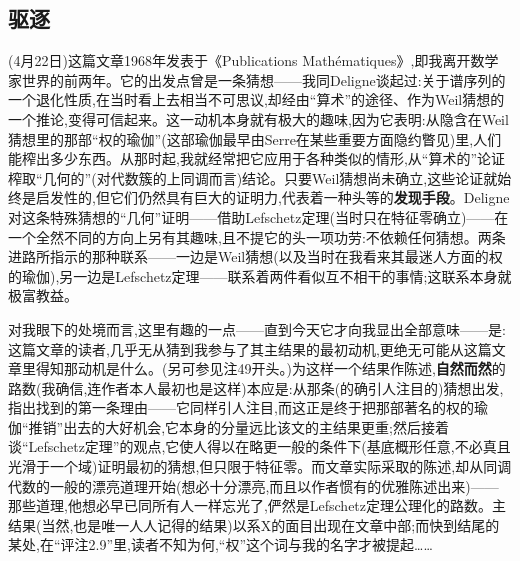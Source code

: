 \subsection{驱逐}


\pmark{} (4月22日)这篇文章1968年发表于《Publications Mathématiques》,即我离开数学家世界的前两年。它的出发点曾是一条猜想——我同Deligne谈起过:关于谱序列的一个退化性质,在当时看上去相当不可思议,却经由“算术”的途径、作为Weil猜想的一个推论,变得可信起来。这一动机本身就有极大的趣味,因为它表明:从隐含在Weil猜想里的那部“权的瑜伽”(这部瑜伽最早由Serre在某些重要方面隐约瞥见)里,人们能榨出多少东西。从那时起,我就经常把它应用于各种类似的情形,从“算术的”论证榨取“几何的”(对代数簇的上同调而言)结论。只要Weil猜想尚未确立,这些论证就始终是启发性的,但它们仍然具有巨大的证明力,代表着一种头等的\textbf{发现手段}。Deligne对这条特殊猜想的“几何”证明——借助Lefschetz定理(当时只在特征零确立)——在一个全然不同的方向上另有其趣味,且不提它的头一项功劳:不依赖任何猜想。两条进路所指示的那种联系——一边是Weil猜想(以及当时在我看来其最迷人方面的权的瑜伽),另一边是Lefschetz定理——联系着两件看似互不相干的事情;这联系本身就极富教益。

对我眼下的处境而言,这里有趣的一点——直到今天它才向我显出全部意味——是:这篇文章的读者,几乎无从猜到我参与了其主结果的最初动机,更绝无可能从这篇文章里得知那动机是什么。(另可参见注49开头。)为这样一个结果作陈述,\textbf{自然而然}的路数(我确信,连作者本人最初也是这样)本应是:从那条(的确引人注目的)猜想出发,指出找到的第一条理由——它同样引人注目,而这正是终于把那部著名的权的瑜伽“推销”出去的大好机会,它本身的分量远比该文的主结果更重\dmark{};然后接着谈“Lefschetz定理”的观点,它使人得以在略更一般的条件下(基底概形任意,不必真且光滑于一个域)证明最初的猜想,但只限于特征零。而文章实际采取的陈述,却从同调代数的一般的漂亮道理开始(想必十分漂亮,而且以作者惯有的优雅陈述出来)——那些道理,他想必早已同所有人一样忘光了,俨然是Lefschetz定理公理化的路数。主结果(当然,也是唯一人人记得的结果)以系X的面目出现在文章中部;而快到结尾的某处,在“评注2.9”里,读者不知为何,“权”这个词与我的名字才被提起……

